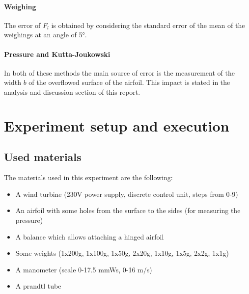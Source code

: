 \documentclass{scrreprt}
\begin{document}
\paragraph*{Weighing}
The error of $F_l$ is obtained by considering the standard error of the mean of the weighings at an angle of \ang{5}.

\paragraph*{Pressure and Kutta-Joukowski}
In both of these methods the main source of error is the measurement of the width $b$ of the overflowed surface of the airfoil. This impact is stated in the analysis and discussion section of this report.

\section{Experiment setup and execution}
\subsection{Used materials}
The materials used in this experiment are the following:
\begin{itemize}
\item A wind turbine (230V power supply, discrete control unit, steps from 0-9)
\item An airfoil with some holes from the surface to the sides (for measuring the pressure)
\item A balance which allows attaching a hinged airfoil
\item Some weights (1x200g, 1x100g, 1x50g, 2x20g, 1x10g, 1x5g, 2x2g, 1x1g)
\item A manometer (scale 0-17.5 mmWs, 0-16 m/s)
\item A prandtl tube
\end{itemize}
\end{document}
